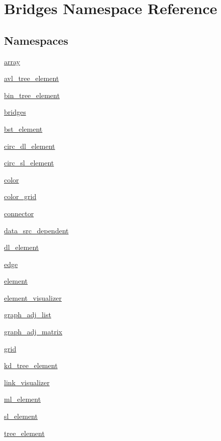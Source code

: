 \hypertarget{namespace_bridges}{}\section{Bridges Namespace Reference}
\label{namespace_bridges}
\subsection*{Namespaces}
\begin{DoxyCompactItemize}
\item 
 \hyperlink{namespace_bridges_1_1array}{array}
\item 
 \hyperlink{namespace_bridges_1_1avl__tree__element}{avl\+\_\+tree\+\_\+element}
\item 
 \hyperlink{namespace_bridges_1_1bin__tree__element}{bin\+\_\+tree\+\_\+element}
\item 
 \hyperlink{namespace_bridges_1_1bridges}{bridges}
\item 
 \hyperlink{namespace_bridges_1_1bst__element}{bst\+\_\+element}
\item 
 \hyperlink{namespace_bridges_1_1circ__dl__element}{circ\+\_\+dl\+\_\+element}
\item 
 \hyperlink{namespace_bridges_1_1circ__sl__element}{circ\+\_\+sl\+\_\+element}
\item 
 \hyperlink{namespace_bridges_1_1color}{color}
\item 
 \hyperlink{namespace_bridges_1_1color__grid}{color\+\_\+grid}
\item 
 \hyperlink{namespace_bridges_1_1connector}{connector}
\item 
 \hyperlink{namespace_bridges_1_1data__src__dependent}{data\+\_\+src\+\_\+dependent}
\item 
 \hyperlink{namespace_bridges_1_1dl__element}{dl\+\_\+element}
\item 
 \hyperlink{namespace_bridges_1_1edge}{edge}
\item 
 \hyperlink{namespace_bridges_1_1element}{element}
\item 
 \hyperlink{namespace_bridges_1_1element__visualizer}{element\+\_\+visualizer}
\item 
 \hyperlink{namespace_bridges_1_1graph__adj__list}{graph\+\_\+adj\+\_\+list}
\item 
 \hyperlink{namespace_bridges_1_1graph__adj__matrix}{graph\+\_\+adj\+\_\+matrix}
\item 
 \hyperlink{namespace_bridges_1_1grid}{grid}
\item 
 \hyperlink{namespace_bridges_1_1kd__tree__element}{kd\+\_\+tree\+\_\+element}
\item 
 \hyperlink{namespace_bridges_1_1link__visualizer}{link\+\_\+visualizer}
\item 
 \hyperlink{namespace_bridges_1_1ml__element}{ml\+\_\+element}
\item 
 \hyperlink{namespace_bridges_1_1sl__element}{sl\+\_\+element}
\item 
 \hyperlink{namespace_bridges_1_1tree__element}{tree\+\_\+element}
\end{DoxyCompactItemize}
